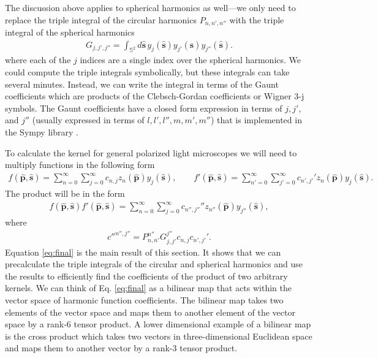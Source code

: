 \documentclass[11pt]{article}
\providecommand{\mh}[1]{\mathbf{\hat{#1}}}
\providecommand{\mbb}[1]{\mathbb{#1}}
\begin{document}
  The discussion above applies to spherical harmonics as well---we only need to replace
  the triple integral of the circular harmonics $P_{n,n',n''}$ with the triple integral
  of the spherical harmonics
  \begin{align}
    G_{j,j',j''} = \int_{\mbb{S}^2}d\mh{s}\, y_{j}(\mh{s})y_{j'}(\mh{s})y_{j''}(\mh{s}).
  \end{align}
  where each of the $j$ indices are a single index over the spherical harmonics.
  We could compute the triple integrals symbolically, but these integrals can
  take several minutes. Instead, we can write the integral in terms of the Gaunt
  coefficients \cite{homeier1996} which are products of the Clebsch-Gordan
  coefficients or Wigner 3-j symbols. The Gaunt coefficients have a closed form
  expression in terms of $j,j'$, and $j''$ (usually expressed in terms of
  $l,l',l'',m,m',m''$) that is implemented in the Sympy library \cite{sympy}.

  To calculate the kernel for general polarized light microscopes we will need to multiply functions in the following form
  \begin{align}
  f(\mh{p}, \mh{s}) = \sum_{n=0}^\infty\sum_{j=0}^\infty c_{n,j} z_n(\mh{p})y_j(\mh{s}), \qquad f'(\mh{p}, \mh{s}) = \sum_{n'=0}^\infty\sum_{j'=0}^\infty c_{n',j'}' z_n(\mh{p})y_j(\mh{s}).
\end{align}
The product will be in the form
\begin{align}
  f(\mh{p}, \mh{s})f'(\mh{p}, \mh{s}) = \sum_{n=0}^\infty\sum_{j=0}^\infty c_{n'',j''}'' z_{n''}(\mh{p})y_{j''}(\mh{s}),
\end{align}
where
\begin{align}
  {c''}^{n'', j''} = P_{n,n'}^{n''} G_{j,j'}^{j''} c_{n,j} c_{n', j'}'.\label{eq:final}
\end{align}
Equation \ref{eq:final} is the main result of this section. It shows that we can
precalculate the triple integrals of the circular and spherical harmonics and
use the results to efficiently find the coefficients of the product of two
arbitrary kernels. We can think of Eq. \ref{eq:final} as a bilinear map that
acts within the vector space of harmonic function coefficients. The bilinear map
takes two elements of the vector space and maps them to another element of the
vector space by a rank-6 tensor product. A lower dimensional example of a
bilinear map is the cross product which takes two vectors in three-dimensional
Euclidean space and maps them to another vector by a rank-3 tensor product.
\end{document}
